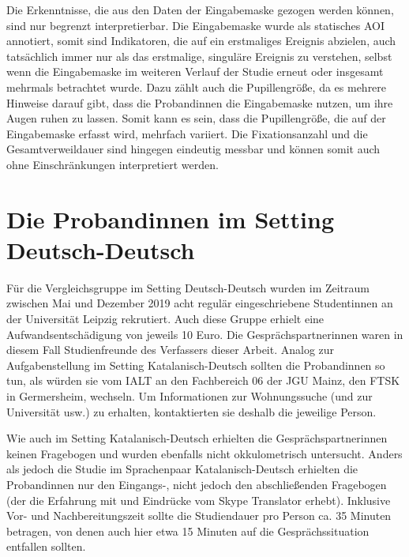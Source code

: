 Die Erkenntnisse, die aus den Daten der Eingabemaske gezogen werden können, sind nur begrenzt interpretierbar. Die Eingabemaske wurde als statisches AOI annotiert, somit sind Indikatoren, die auf ein erstmaliges Ereignis abzielen, auch tatsächlich immer nur als das erstmalige, singuläre Ereignis zu verstehen, selbst wenn die Eingabemaske im weiteren Verlauf der Studie erneut oder insgesamt mehrmals betrachtet wurde. Dazu zählt auch die Pupillengröße, da es mehrere Hinweise darauf gibt, dass die Proband{\textperiodcentered}innen die Eingabemaske nutzen, um ihre Augen ruhen zu lassen. Somit kann es sein, dass die Pupillengröße, die auf der Eingabemaske erfasst wird, mehrfach variiert. Die Fixationsanzahl und die Gesamtverweildauer sind hingegen eindeutig messbar und können somit auch ohne Einschränkungen interpretiert werden.



\section{Die Proband{\textperiodcentered}innen im Setting Deutsch-Deutsch}
\label{K6:sec:Probandinnen-DeDe}


Für die Vergleichsgruppe im Setting Deutsch-Deutsch wurden im Zeitraum zwischen Mai und Dezember 2019 acht regulär eingeschriebene Student{\textperiodcentered}innen an der Universität Leipzig rekrutiert. Auch diese Gruppe erhielt eine Aufwandsentschädigung von jeweils 10 Euro. Die Gesprächspartner{\textperiodcentered}innen waren in diesem Fall Studienfreunde des Verfassers dieser Arbeit. Analog zur Aufgabenstellung im Setting Katalanisch-Deutsch sollten die Proband{\textperiodcentered}innen so tun, als würden sie vom IALT an den Fachbereich 06 der JGU Mainz, den FTSK in Germersheim, wechseln. Um Informationen zur Wohnungssuche (und zur Universität usw.) zu erhalten, kontaktierten sie deshalb die jeweilige Person.

\begin{sloppypar}
Wie auch im Setting Katalanisch-Deutsch erhielten die Gesprächspartner{\textperiodcentered}\linebreak[3]innen keinen Fragebogen und wurden ebenfalls nicht okkulometrisch untersucht. Anders als jedoch die Studie im Sprachenpaar Katalanisch-Deutsch erhielten die Proband{\textperiodcentered}innen nur den Eingangs-, nicht jedoch den abschließenden Fragebogen (der die Erfahrung mit und Eindrücke vom Skype Translator erhebt). Inklusive Vor- und Nachbereitungszeit sollte die Studiendauer pro Person ca. 35 Minuten betragen, von denen auch hier etwa 15 Minuten auf die Gesprächssituation entfallen sollten.
\end{sloppypar}

